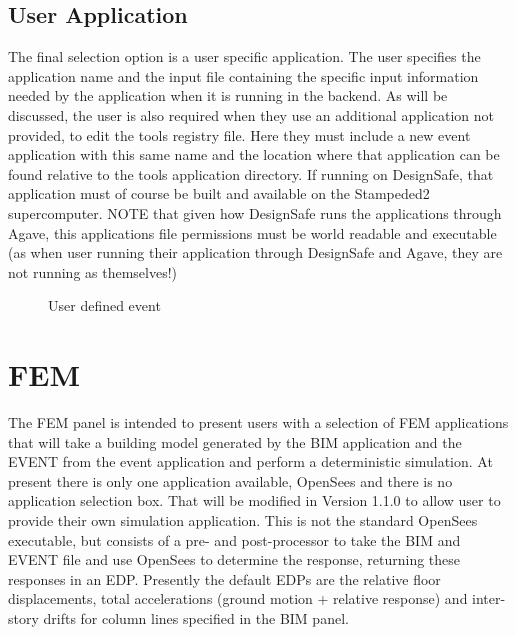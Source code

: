 



\subsection{User Application}
The final selection option is a user specific application. 
The user specifies the application name and the input file containing the specific input information 
needed by the application when it is running in the backend. 
As will be discussed, the user is also required when they use an additional application not provided, 
to edit the tools registry file. Here they must include a new event application with this same name 
and the location where that application can be found relative to the tools application directory. 
If running on DesignSafe, that application must of course be built and available on the Stampeded2 supercomputer. 
NOTE that given how DesignSafe runs the applications through Agave, this applications file permissions must be 
world readable and executable (as when user running their application through DesignSafe and Agave, they are not running as themselves!)

\begin{figure}[!htbp]
  \caption{User defined event}
  \label{fig:figure8}
\end{figure}


\section{FEM}
The FEM panel is intended to present users with a selection of FEM applications that will take a building model 
generated by the BIM application and the EVENT from the event application and perform a deterministic simulation. 
At present there is only one application available, OpenSees and there is no application selection box. 
That will be modified in Version 1.1.0 to allow user to provide their own simulation application. 
This is not the standard OpenSees executable, but consists of a pre- and post-processor to take the 
BIM and EVENT file and use OpenSees to determine the response, returning these responses in an EDP. 
Presently the default EDPs are the relative floor displacements, total accelerations (ground motion + relative response) 
and inter-story drifts for column lines specified in the BIM panel.

